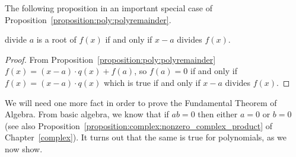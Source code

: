 The following proposition in an important special case of Proposition~\ref{proposition:poly:polyremainder}.

\begin {prop}{divide}
$a$ is a root of $f(x)$ if and only if $x-a$ divides $f(x)$.
\end {prop}

\begin{proof}
From Proposition~\ref{proposition:poly:polyremainder} $f(x) = (x-a) \cdot q(x) + f(a)$, so $f(a) = 0$ if and only if $f(x)=(x-a) \cdot q(x)$ which is true if and only if $x-a$ divides $f(x)$.
\end{proof}


We will need one more fact in order to prove the Fundamental Theorem of Algebra. From basic algebra, we know that if $ab=0$ then either $a=0$ or $b=0$ (see also 
Proposition~\ref{proposition:complex:nonzero_complex_product} of Chapter~\ref{complex}).  It turns out that the same is true for polynomials, as we now show.

